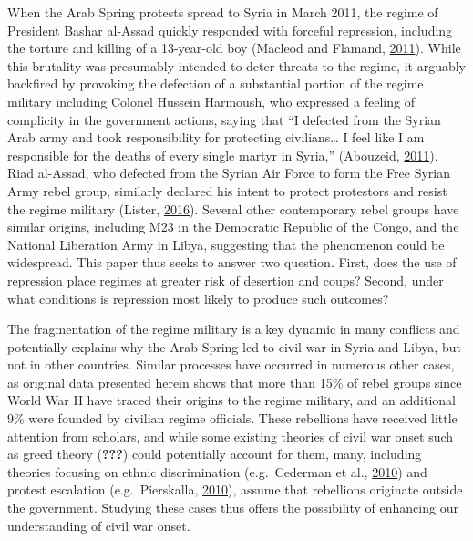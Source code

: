 \documentclass[
  12pt,
]{article}
\begin{document}
When the Arab Spring protests spread to Syria in March 2011, the regime of President Bashar al-Assad quickly responded with forceful repression, including the torture and killing of a 13-year-old boy (Macleod and Flamand, \protect\hyperlink{ref-Macleod2011}{2011}). While this brutality was presumably intended to deter threats to the regime, it arguably backfired by provoking the defection of a substantial portion of the regime military including Colonel Hussein Harmoush, who expressed a feeling of complicity in the government actions, saying that ``I defected from the Syrian Arab army and took responsibility for protecting civilians\ldots{} I feel like I am responsible for the deaths of every single martyr in Syria,'' (Abouzeid, \protect\hyperlink{ref-Abouzeid2011}{2011}). Riad al-Assad, who defected from the Syrian Air Force to form the Free Syrian Army rebel group, similarly declared his intent to protect protestors and resist the regime military (Lister, \protect\hyperlink{ref-Lister2016}{2016}). Several other contemporary rebel groups have similar origins, including M23 in the Democratic Republic of the Congo, and the National Liberation Army in Libya, suggesting that the phenomenon could be widespread. This paper thus seeks to answer two question. First, does the use of repression place regimes at greater risk of desertion and coups? Second, under what conditions is repression most likely to produce such outcomes?

The fragmentation of the regime military is a key dynamic in many conflicts and potentially explains why the Arab Spring led to civil war in Syria and Libya, but not in other countries. Similar processes have occurred in numerous other cases, as original data presented herein shows that more than 15\% of rebel groups since World War II have traced their origins to the regime military, and an additional 9\% were founded by civilian regime officials. These rebellions have received little attention from scholars, and while some existing theories of civil war onset such as greed theory ({\textbf{???}}) could potentially account for them, many, including theories focusing on ethnic discrimination (e.g.~Cederman et al., \protect\hyperlink{ref-Cederman2010}{2010}) and protest escalation (e.g.~Pierskalla, \protect\hyperlink{ref-Pierskalla2010}{2010}), assume that rebellions originate outside the government. Studying these cases thus offers the possibility of enhancing our understanding of civil war onset.
\end{document}
